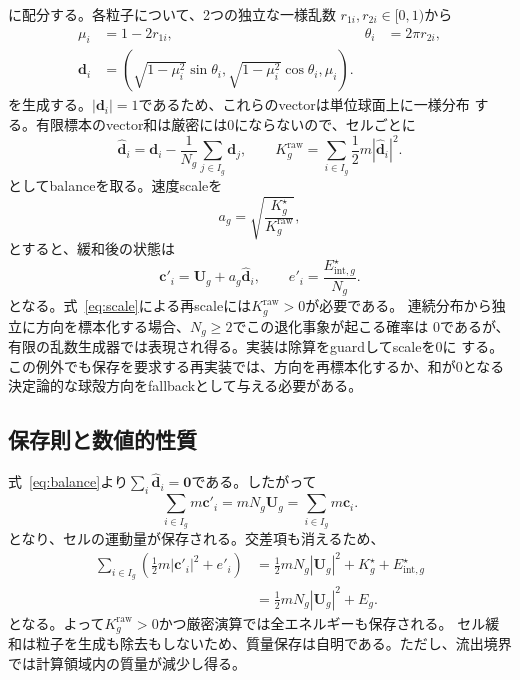 \documentclass[a4paper,11pt]{ltjsarticle}
\newcommand{\vect}[1]{\bm{#1}}
\begin{document}
に配分する。各粒子について、2つの独立な一様乱数
$r_{1i},r_{2i}\in[0,1)$から
\begin{align}
 \mu_i &= 1-2r_{1i}, & \theta_i&=2\pi r_{2i},\\
 \vect{d}_i &=
 \left(\sqrt{1-\mu_i^2}\sin\theta_i,
       \sqrt{1-\mu_i^2}\cos\theta_i,\mu_i\right).
 \label{eq:shell}
\end{align}
を生成する。$|\vect{d}_i|=1$であるため、これらのvectorは単位球面上に一様分布
する。有限標本のvector和は厳密には0にならないので、セルごとに
\begin{equation}
 \widehat{\vect{d}}_i=\vect{d}_i-
 \frac{1}{N_g}\sum_{j\in I_g}\vect{d}_j,
 \qquad
 K_g^{\mathrm{raw}}=\sum_{i\in I_g}\frac12m
 |\widehat{\vect{d}}_i|^2.
 \label{eq:balance}
\end{equation}
としてbalanceを取る。速度scaleを
\begin{equation}
 a_g=\sqrt{\frac{K_g^{\star}}{K_g^{\mathrm{raw}}}},
 \label{eq:scale}
\end{equation}
とすると、緩和後の状態は
\begin{equation}
 \vect{c}'_i=\vect{U}_g+a_g\widehat{\vect{d}}_i,
 \qquad
 e'_i=\frac{E_{\mathrm{int},g}^{\star}}{N_g}.
 \label{eq:update}
\end{equation}
となる。式~\eqref{eq:scale}による再scaleには$K_g^{\mathrm{raw}}>0$が必要である。
連続分布から独立に方向を標本化する場合、$N_g\geq2$でこの退化事象が起こる確率は
0であるが、有限の乱数生成器では表現され得る。実装は除算をguardしてscaleを0に
する。この例外でも保存を要求する再実装では、方向を再標本化するか、和が0となる
決定論的な球殻方向をfallbackとして与える必要がある。

\subsection{保存則と数値的性質}

式~\eqref{eq:balance}より$\sum_i\widehat{\vect{d}}_i=\vect{0}$である。したがって
\begin{equation}
 \sum_{i\in I_g}m\vect{c}'_i=mN_g\vect{U}_g
 =\sum_{i\in I_g}m\vect{c}_i.
\end{equation}
となり、セルの運動量が保存される。交差項も消えるため、
\begin{align}
 \sum_{i\in I_g}\left(\frac12m|\vect{c}'_i|^2+e'_i\right)
 &=\frac12mN_g|\vect{U}_g|^2+K_g^{\star}
   +E_{\mathrm{int},g}^{\star}\\
 &=\frac12mN_g|\vect{U}_g|^2+E_g.
\end{align}
となる。よって$K_g^{\mathrm{raw}}>0$かつ厳密演算では全エネルギーも保存される。
セル緩和は粒子を生成も除去もしないため、質量保存は自明である。ただし、流出境界
では計算領域内の質量が減少し得る。
\end{document}
